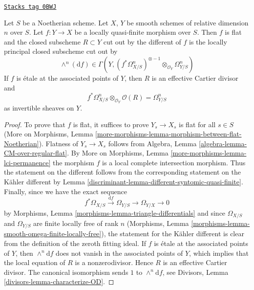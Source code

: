 \begin{lemma}
\label{discriminant-lemma-discriminant-quasi-finite-morphism-smooth}
\href{https://stacks.math.columbia.edu/tag/0BWJ}{\texttt{Stacks tag 0BWJ}}

Let $S$ be a Noetherian scheme. Let $X$, $Y$ be smooth schemes
of relative dimension $n$ over $S$. Let $f : Y \to X$ be a
locally quasi-finite morphism over $S$.
Then $f$ is flat and the closed subscheme $R \subset Y$
cut out by the different of $f$ is the locally principal
closed subscheme cut out by
$$
\wedge^n(\text{d}f) \in
\Gamma(Y,
(f^*\Omega^n_{X/S})^{\otimes -1} \otimes_{\mathcal{O}_Y} \Omega^n_{Y/S})
$$
If $f$ is \'etale at the associated points of $Y$, then $R$ is an
effective Cartier divisor and
$$
f^*\Omega^n_{X/S} \otimes_{\mathcal{O}_Y} \mathcal{O}(R) =
\Omega^n_{Y/S}
$$
as invertible sheaves on $Y$.
\end{lemma}

\begin{proof}

To prove that $f$ is flat, it suffices to prove $Y_s \to X_s$
is flat for all $s \in S$ (More on Morphisms, Lemma
\ref{more-morphisms-lemma-morphism-between-flat-Noetherian}).
Flatness of $Y_s \to X_s$ follows from
Algebra, Lemma \ref{algebra-lemma-CM-over-regular-flat}.
By More on Morphisms, Lemma
\ref{more-morphisms-lemma-lci-permanence}
the morphism $f$ is a local complete intersection morphism.
Thus the statement on the different follows from the
corresponding statement on the K\"ahler different by
Lemma \ref{discriminant-lemma-different-syntomic-quasi-finite}.
Finally, since we have the exact sequence
$$
f^*\Omega_{X/S} \xrightarrow{\text{d}f} \Omega_{Y/S} \to \Omega_{Y/X} \to 0
$$
by Morphisms, Lemma \ref{morphisms-lemma-triangle-differentials}
and since $\Omega_{X/S}$ and $\Omega_{Y/S}$ are finite locally free
of rank $n$ (Morphisms, Lemma
\ref{morphisms-lemma-smooth-omega-finite-locally-free}),
the statement for the K\"ahler different is clear from the definition
of the zeroth fitting ideal. If $f$ is \'etale at the associated
points of $Y$, then $\wedge^n\text{d}f$ does not vanish in
the associated points of $Y$, which implies that the local equation
of $R$ is a nonzerodivisor. Hence $R$ is an effective Cartier divisor.
The canonical isomorphism sends $1$ to $\wedge^n\text{d}f$, see
Divisors, Lemma \ref{divisors-lemma-characterize-OD}.
\end{proof}


